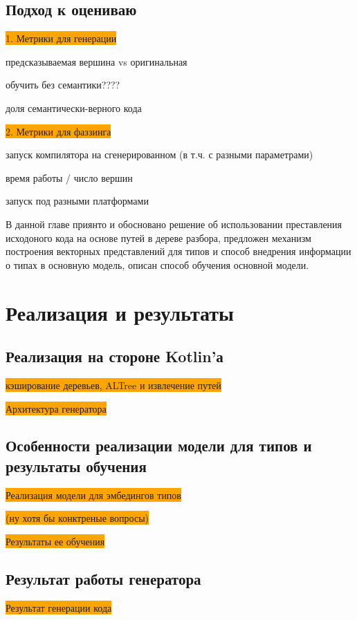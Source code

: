 \documentclass[times,specification,annotation]{itmo-student-thesis}
\begin{document}
\section{Подход к оцениваю}\label{rate}
\colorbox{orange}{1. Метрики для генерации}

предсказываемая вершина vs оригинальная

обучить без семантики????

доля семантически-верного кода

\colorbox{orange}{2. Метрики для фаззинга}

запуск компилятора на сгенерированном (в т.ч. с разными параметрами)

время работы / число вершин

запуск под разными платформами

\chapterconclusion

В данной главе приянто и обосновано решение об использовании преставления исходоного кода на основе путей в дереве разбора, предложен механизм построения векторных представлений для типов и способ внедрения информации о типах в основную модель, описан способ обучения основной модели.


\chapter{Реализация и результаты}

\section{Реализация на стороне Kotlin'а}
\colorbox{orange}{кэширование деревьев, ALTree и извлечение путей}

\colorbox{orange}{Архитектура генератора}

\section{Особенности реализации модели для типов и результаты обучения}
\colorbox{orange}{Реализация модели для эмбедингов типов}

\colorbox{orange}{(ну хотя бы конктреные вопросы)}


\colorbox{orange}{Результаты ее обучения}

\section{Результат работы генератора}
\colorbox{orange}{Результат генерации кода}
\end{document}
